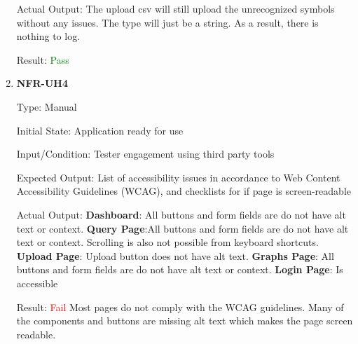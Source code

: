 \documentclass[12pt, titlepage]{article}
\begin{document}
\begin{enumerate}
Actual Output: The upload csv will still upload the unrecognized symbols without
any issues. The type will just be a string. As a result, there is nothing to
log. 

Result: \textcolor{green}{Pass} 

\item{\textbf{NFR-UH4}} \label{NFR:UH4}

Type: Manual

Initial State: Application ready for use

Input/Condition: Tester engagement using third party tools

Expected Output: List of accessibility issues in accordance to Web Content
Accessibility Guidelines (WCAG), and checklists for if page is screen-readable

Actual Output:\newline
\textbf{Dashboard}: All buttons and form fields are do not have alt text or
context. \newline
\textbf{Query Page}:All buttons and form fields are do not have alt text or
context. Scrolling is also not possible from keyboard shortcuts. \newline
\textbf{Upload Page}: Upload button does not have alt text.\newline
\textbf{Graphs Page}: All buttons and form fields are do not have alt text or
context.\newline
\textbf{Login Page}: Is accessible

Result: \textcolor{red}{Fail} \newline
Most pages do not comply with the WCAG guidelines. Many of the components and
buttons are missing alt text which makes the page screen readable. 
 \end{enumerate}
\end{document}
